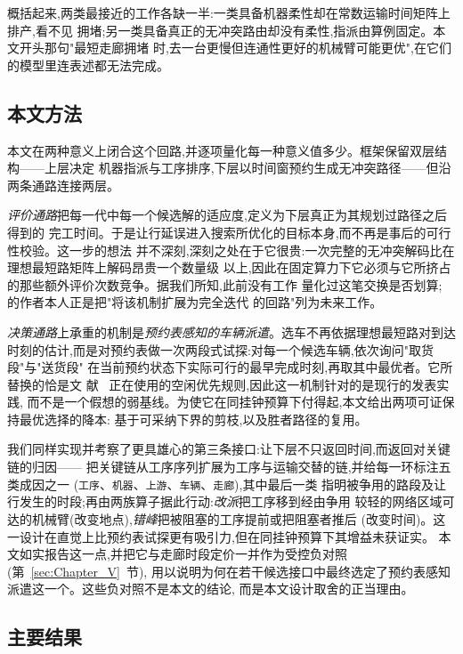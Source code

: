 \documentclass[manuscript,screen,review]{acmart}
\begin{document}
概括起来,两类最接近的工作各缺一半:一类具备机器柔性却在常数运输时间矩阵上排产,看不见
拥堵;另一类具备真正的无冲突路由却没有柔性,指派由算例固定。本文开头那句"最短走廊拥堵
时,去一台更慢但连通性更好的机械臂可能更优",在它们的模型里连表述都无法完成。

\subsection{本文方法}

本文在两种意义上闭合这个回路,并逐项量化每一种意义值多少。框架保留双层结构——上层决定
机器指派与工序排序,下层以时间窗预约生成无冲突路径——但沿两条通路连接两层。

\emph{评价通路}把每一代中每一个候选解的适应度,定义为下层真正为其规划过路径之后得到的
完工时间。于是让行延误进入搜索所优化的目标本身,而不再是事后的可行性校验。这一步的想法
并不深刻,深刻之处在于它很贵:一次完整的无冲突解码比在理想最短路矩阵上解码昂贵一个数量级
以上,因此在固定算力下它必须与它所挤占的那些额外评价次数竞争。据我们所知,此前没有工作
量化过这笔交换是否划算;\cite{li2026framework} 的作者本人正是把"将该机制扩展为完全迭代
的回路"列为未来工作。

\emph{决策通路}上承重的机制是\emph{预约表感知的车辆派遣}。选车不再依据理想最短路对到达
时刻的估计,而是对预约表做一次两段式试探:对每一个候选车辆,依次询问"取货段"与"送货段"
在当前预约状态下实际可行的最早完成时刻,再取其中最优者。它所替换的恰是文
献~\cite{li2026framework} 正在使用的空闲优先规则,因此这一机制针对的是现行的发表实践,
而不是一个假想的弱基线。为使它在同挂钟预算下付得起,本文给出两项可证保持最优选择的降本:
基于可采纳下界的剪枝,以及胜者路径的复用。

我们同样实现并考察了更具雄心的第三条接口:让下层不只返回时间,而返回对关键链的归因——
把关键链从工序序列扩展为工序与运输交替的链,并给每一环标注五类成因之一
(\texttt{工序}、\texttt{机器}、\texttt{上游}、\texttt{车辆}、\texttt{走廊}),其中最后一类
指明被争用的路段及让行发生的时段;再由两族算子据此行动:\emph{改派}把工序移到经由争用
较轻的网络区域可达的机械臂(改变地点),\emph{错峰}把被阻塞的工序提前或把阻塞者推后
(改变时间)。这一设计在直觉上比预约表试探更有吸引力,但在同挂钟预算下其增益未获证实。
本文如实报告这一点,并把它与走廊时段定价一并作为受控负对照(第~\ref{sec:Chapter_V}~节),
用以说明为何在若干候选接口中最终选定了预约表感知派遣这一个。这些负对照不是本文的结论,
而是本文设计取舍的正当理由。

\subsection{主要结果}
\end{document}
